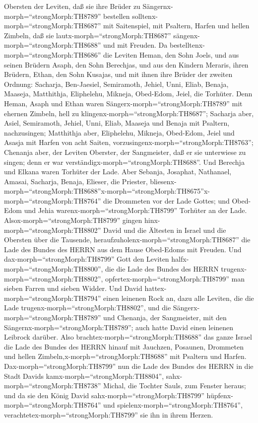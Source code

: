Obersten der Leviten, daß sie ihre Brüder zu
Sängernx-morph=``strongMorph:TH8789'' bestellen
solltenx-morph=``strongMorph:TH8687'' mit Saitenspiel, mit Psaltern,
Harfen und hellen Zimbeln, daß sie lautx-morph=``strongMorph:TH8687''
sängenx-morph=``strongMorph:TH8688'' und mit Freuden.  Da
bestelltenx-morph=``strongMorph:TH8686'' die Leviten Heman, den Sohn
Joels, und aus seinen Brüdern Asaph, den Sohn Berechjas, und aus den
Kindern Meraris, ihren Brüdern, Ethan, den Sohn Kusajas, 
und mit ihnen ihre Brüder der zweiten Ordnung: Sacharja, Ben-Jaesiel,
Semiramoth, Jehiel, Unni, Eliab, Benaja, Maaseja, Matthithja,
Eliphelehu, Mikneja, Obed-Edom, Jeiel, die Torhüter.  Denn
Heman, Asaph und Ethan waren Sängerx-morph=``strongMorph:TH8789'' mit
ehernen Zimbeln, hell zu klingenx-morph=``strongMorph:TH8687'';
 Sacharja aber, Asiel, Semiramoth, Jehiel, Unni, Eliab,
Maaseja und Benaja mit Psaltern, nachzusingen;  Matthithja
aber, Eliphelehu, Mikneja, Obed-Edom, Jeiel und Asasja mit Harfen von
acht Saiten, vorzusingenx-morph=``strongMorph:TH8763''; 
Chenanja aber, der Leviten Oberster, der Sangmeister, daß er sie
unterwiese zu singen; denn er war
verständigx-morph=``strongMorph:TH8688''.  Und Berechja und
Elkana waren Torhüter der Lade.  Aber Sebanja, Josaphat,
Nathanael, Amasai, Sacharja, Benaja, Elieser, die Priester,
bliesenx-morph=``strongMorph:TH8688''\textbar x-morph=``strongMorph:TH8675''x-morph=``strongMorph:TH8764''
die Drommeten vor der Lade Gottes; und Obed-Edom und Jehia
warenx-morph=``strongMorph:TH8799'' Torhüter an der Lade. 
Alsox-morph=``strongMorph:TH8799'' gingen
hinx-morph=``strongMorph:TH8802'' David und die Ältesten in Israel und
die Obersten über die Tausende,
heraufzuholenx-morph=``strongMorph:TH8687'' die Lade des Bundes des
HERRN aus dem Hause Obed-Edoms mit Freuden.  Und
dax-morph=``strongMorph:TH8799'' Gott den Leviten
halfx-morph=``strongMorph:TH8800'', die die Lade des Bundes des HERRN
trugenx-morph=``strongMorph:TH8802'',
opfertex-morph=``strongMorph:TH8799'' man sieben Farren und sieben
Widder.  Und David hattex-morph=``strongMorph:TH8794''
einen leinenen Rock an, dazu alle Leviten, die die Lade
trugenx-morph=``strongMorph:TH8802'', und die
Sängerx-morph=``strongMorph:TH8789'' und Chenanja, der Sangmeister, mit
den Sängernx-morph=``strongMorph:TH8789''; auch hatte David einen
leinenen Leibrock darüber.  Also
brachtex-morph=``strongMorph:TH8688'' das ganze Israel die Lade des
Bundes des HERRN hinauf mit Jauchzen, Posaunen, Drommeten und hellen
Zimbeln,x-morph=``strongMorph:TH8688'' mit Psaltern und Harfen.
 Dax-morph=``strongMorph:TH8799'' nun die Lade des Bundes
des HERRN in die Stadt Davids kamx-morph=``strongMorph:TH8804'',
sahx-morph=``strongMorph:TH8738'' Michal, die Tochter Sauls, zum Fenster
heraus; und da sie den König David sahx-morph=``strongMorph:TH8799''
hüpfenx-morph=``strongMorph:TH8764'' und
spielenx-morph=``strongMorph:TH8764'',
verachtetex-morph=``strongMorph:TH8799'' sie ihn in ihrem Herzen.

